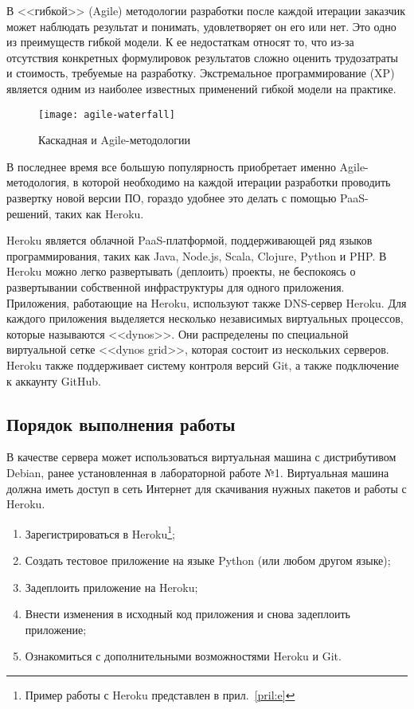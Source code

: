 В <<гибкой>> (Agile) методологии разработки после каждой итерации заказчик может наблюдать результат и понимать, удовлетворяет он его или нет.
Это одно из преимуществ гибкой модели.
К ее недостаткам относят то, что из-за отсутствия конкретных формулировок результатов сложно оценить трудозатраты и стоимость, требуемые на разработку.
Экстремальное программирование (XP) является одним из наиболее известных применений гибкой модели на практике.

\begin{figure}[ht]
    \centering
	\texttt{[image: agile-waterfall]}
	\caption{Каскадная и Agile-методологии}\label{pic:agile-waterfall}
\end{figure}

В последнее время все большую популярность приобретает именно Agile-методология, в которой необходимо на каждой итерации разработки проводить развертку новой версии ПО, гораздо удобнее это делать с помощью PaaS-решений, таких как Heroku.

Heroku является облачной PaaS-платформой, поддерживающей ряд языков программирования, таких как Java, Node.js, Scala, Clojure, Python и PHP.
В Heroku можно легко развертывать (деплоить) проекты, не беспокоясь о развертывании собственной инфраструктуры для одного приложения.
Приложения, работающие на Heroku, используют также DNS-сервер Heroku.
Для каждого приложения выделяется несколько независимых виртуальных процессов, которые называются <<dynos>>.
Они распределены по специальной виртуальной сетке <<dynos grid>>, которая состоит из нескольких серверов.
Heroku также поддерживает систему контроля версий Git, а также подключение к аккаунту GitHub.

\subsection{Порядок выполнения работы}

В качестве сервера может использоваться виртуальная машина с дистрибутивом Debian, ранее установленная в лабораторной работе №1.
Виртуальная машина должна иметь доступ в сеть Интернет для скачивания нужных пакетов и работы с Heroku.

\begin{enumerate}
    \item Зарегистрироваться в Heroku\footnote{Пример работы с Heroku представлен в прил.~\ref{pril:e}};
    \item Создать тестовое приложение на языке Python (или любом другом языке);
    \item Задеплоить приложение на Heroku;
    \item Внести изменения в исходный код приложения и снова задеплоить приложение;
    \item Ознакомиться с дополнительными возможностями Heroku и Git.
\end{enumerate}

